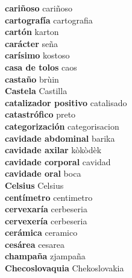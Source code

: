 \textbf{ cariñoso  } cariñoso \\
\textbf{ cartografía  } cartografia \\
\textbf{ cartón  } karton \\
\textbf{ carácter  } seña \\
\textbf{ carísimo  } kostoso \\
\textbf{ casa de tolos  } caos \\
\textbf{ castaño  } brùin \\
\textbf{ Castela  } Castilla \\
\textbf{ catalizador positivo  } catalisado \\
\textbf{ catastrófico  } preto \\
\textbf{ categorización  } categorisacion \\
\textbf{ cavidade abdominal  } barika \\
\textbf{ cavidade axilar  } kòkòdèk \\
\textbf{ cavidade corporal  } cavidad \\
\textbf{ cavidade oral  } boca \\
\textbf{ Celsius  } Celsius \\
\textbf{ centímetro  } centimetro \\
\textbf{ cervexaría  } cerbeseria \\
\textbf{ cervexería  } cerbeseria \\
\textbf{ cerámica  } ceramico \\
\textbf{ cesárea  } cesarea \\
\textbf{ champaña  } zjampaña \\
\textbf{ Checoslovaquia  } Chekoslovakia \\
